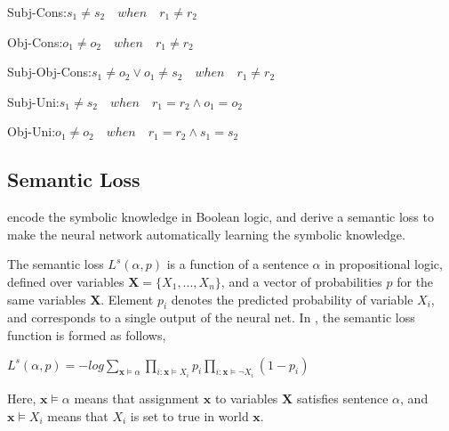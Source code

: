 Subj-Cons:$s_1 \neq s_2 \quad when \quad r_1 \neq r_2$
	
Obj-Cons:$o_1 \neq o_2 \quad when \quad r_1 \neq r_2$
	
Subj-Obj-Cons:$s_1 \neq o_2 \vee o_1 \neq s_2 \quad when \quad r_1 \neq r_2$

Subj-Uni:$s_1 \neq s_2 \quad when \quad r_1 = r_2 \wedge o_1 = o_2$

Obj-Uni:$o_1 \neq o_2 \quad when \quad r_1 = r_2 \wedge s_1 = s_2$
\fi


\subsection{Semantic Loss}
\cite{xu2017semantic}  encode the symbolic knowledge in Boolean logic, and derive a semantic loss to make the neural network automatically learning the symbolic knowledge. 

The semantic loss $L^{s}(\alpha, p)$ is a function of a sentence $\alpha$ in propositional logic, defined over variables $\bm X=\{X_1,...,X_n\}$, and a vector of probabilities $p$ for the same variables $\bm X$. Element $p_i$ denotes the predicted probability of variable $X_i$, and corresponds to a single output of the neural net. 
In \cite{xu2017semantic}, the semantic loss function is formed as follows,

\begin{center}
	$L^{s}(\alpha, p) = -log\sum\limits_{\bm x\models\alpha}\prod\limits_{i:\bm x\models X_i}p_i\prod\limits_{i:\bm x\models \neg X_i}(1-p_i)$
\end{center}

Here, $\bm x \models \alpha$ means that assignment $\bm x$ to variables $\bm X$ satisfies sentence $\alpha$, and $\bm x \models X_i$ means that $X_i$ is set to true in world $\bm x$. 

